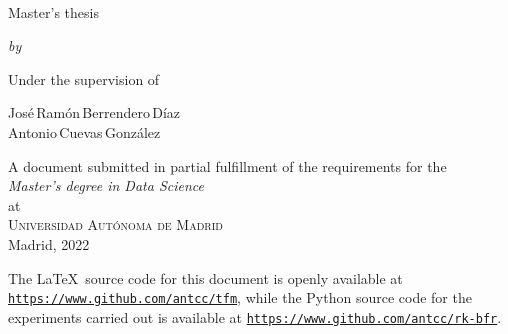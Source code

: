 
\begin{titlepage}
  \vspace*{5cm}
  \makeatletter
  \begin{center}
    \begin{singlespace*}
    \begin{Huge}
      \@title
    \end{Huge}\\[1cm]
    \begin{large}
      Master's thesis
    \end{large}
    \vskip 0.1cm
    \emph{by}
    \vskip 0.18cm
    \begin{Large}
    \textsc{\@author}
  \end{Large}
  \end{singlespace*}
    \vfill

    Under the supervision of
    \begin{large}
    \vskip 0.1cm
    José\,Ramón\,Berrendero\,Díaz\\
    Antonio\,Cuevas\,González\\[1cm]
  \end{large}

    A document submitted in partial fulfillment
    of the requirements for the\\
    \emph{Master's degree in Data Science}\\
    at\\
    \textsc{Universidad Autónoma de Madrid}\\[1cm]

    Madrid, 2022
  \end{center}
  \makeatother
\end{titlepage}
\newpage





\thispagestyle{empty}
\pagebreak
\hspace{0pt}
\vfill
\begin{center}
    \begin{minipage}[t]{12.5cm}
        \doclicenseThis
        The \LaTeX\ source code for this document is openly available at \texttt{\url{https://www.github.com/antcc/tfm}}, while the Python source code for the experiments carried out is available at \texttt{\url{https://www.github.com/antcc/rk-bfr}}.
    \end{minipage}
\end{center}
\vfill
\hspace{0pt}
\pagebreak
\newpage

